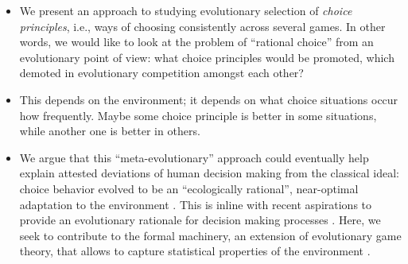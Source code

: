 \documentclass[fleqn,reqno,11pt]{article}
\begin{document}
\begin{itemize}
\item We present an approach to studying evolutionary selection of \emph{choice principles},
  i.e., ways of choosing consistently across several games. In other words, we would like to
  look at the problem of ``rational choice'' from an evolutionary point of view: what choice
  principles would be promoted, which demoted in evolutionary competition amongst each other?

\item This depends on the environment; it depends on what choice situations occur how
  frequently. Maybe some choice principle is better in some situations, while another one is
  better in others. 


\item We argue that this ``meta-evolutionary'' approach could eventually help explain attested
  deviations of human decision making from the classical ideal: choice behavior evolved to be
  an ``ecologically rational'', near-optimal adaptation to the environment
  \citep{Anderson1990:The-Adaptive-Ch,Anderson1991:Is-human-cognit,GigerenzerGoldstein1996:Reasoning-the-F,ChaterOaksford2000:The-Rational-An}. This
  is inline with recent aspirations to provide an evolutionary rationale for decision making
  processes
  \citep[e.g.][]{HammersteinStevens2012:Six-Reasons-for,FawcettHamblin2013:Exposing-the-be}. Here,
  we seek to contribute to the formal machinery, an extension of evolutionary game theory, that
  allows to capture statistical properties of the environment
  \citep[cf.][]{McNamara2013:Towards-a-Riche}.
\end{itemize}
\end{document}
